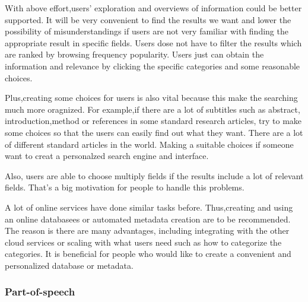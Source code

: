 With above effort,users' exploration and overviews of information could be better supported. 
It will be very convenient to find the results we want and lower the possibility of misunderstandings if users are not 
very familiar with finding the appropriate result in specific fields.\cite{TunThuraThet2010} 
Users dose not have to filter the results which are ranked by browsing frequency popularity. 
Users just can obtain the information and relevance by clicking the specific categories and some reasonable choices.

Plus,creating some choices for users is also vital because this make the searching much more oragnized.
For example,if there are a lot of subtitles such as abstract, introduction,method or references in some standard research 
articles, try to make some choices so that the users can easily find out what they want.
There are a lot of different standard articles in the world.
Making a suitable choices if someone want to creat a personalzed search engine and interface. 
     
Also, users are able to choose multiply fields if the results include a lot of relevant fields. 
That's a big motivation for people to handle this problems. 

A lot of online services have done similar tasks before.
Thus,creating and using an online databasees or automated metadata creation are to be recommended.
The reason is there are many advantages, including integrating with the other cloud services or scaling with what users 
need such as how to categorize the categories.
It is beneficial for people who would like to create a convenient and personalized database or metadata.\\


\subsubsection*{Part-of-speech}

